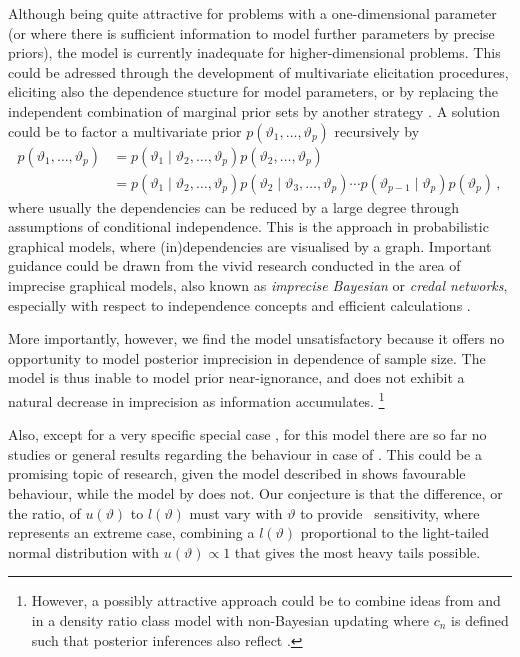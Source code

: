 Although being quite attractive for problems with a one-dimensional parameter
(or where there is sufficient information to model further parameters by precise priors),
the model is currently inadequate for higher-dimensional problems.
This could be adressed through the development of multivariate elicitation procedures,
eliciting also the dependence stucture for model parameters,
or by replacing the independent combination of marginal prior sets
by another strategy \parencite[as mentioned in][\S 5.2]{2011:rinderknecht:diss}.
A solution could be to factor a multivariate prior $p(\vartheta_1,\ldots,\vartheta_p)$
recursively by
\begin{align*}
p(\vartheta_1,\ldots,\vartheta_p)
 &= p(\vartheta_1\mid \vartheta_2,\ldots,\vartheta_p) p(\vartheta_2,\ldots,\vartheta_p) \\
 &= p(\vartheta_1\mid \vartheta_2,\ldots,\vartheta_p) p(\vartheta_2\mid \vartheta_3,\ldots,\vartheta_p)
    \cdots p(\vartheta_{p-1}\mid\vartheta_p) p(\vartheta_p)\,,
\end{align*}
where usually the dependencies can be reduced by a large degree through assumptions of conditional independence.
This is the approach in probabilistic graphical models,
where (in)dependencies are visualised by a graph.
Important guidance could be drawn from the vivid research conducted in the area
of imprecise graphical models, also known as \emph{imprecise Bayesian} or \emph{credal networks},
especially with respect to independence concepts and efficient calculations
\parencite[for a recent overview, see][]{itip-ipgms}.

More importantly, however, we find the model unsatisfactory because it offers no opportunity
to model posterior imprecision in dependence of sample size. %
The model is thus inable to model prior near-ignorance, and does not exhibit
a natural decrease in imprecision as information accumulates.%
\footnote{However, a possibly attractive approach could be to
combine ideas from \textcite{1993:coolen} and \textcite{2011:rinderknecht:diss}
in a density ratio class model with non-Bayesian updating
where $c_n$ is defined such that posterior inferences also reflect \pdc.}

Also, except for a very specific special case \parencite[\S 4.3, as discussed above]{1991:pericchi},
for this model there are so far no studies or general results regarding the behaviour in case of \pdc.
This could be a promising topic of research,
given the model described in \textcite[\S 4.3]{1991:pericchi} shows favourable behaviour,
while the model by \textcite{1993:coolen} does not.
Our conjecture is that the difference, or the ratio, of $u(\vartheta)$ to $l(\vartheta)$
must vary with $\vartheta$ to provide \pdc\ sensitivity,
where \textcite[\S 4.3]{1991:pericchi} represents an extreme case,
combining a $l(\vartheta)$ proportional to the light-tailed normal distribution %
with $u(\vartheta) \propto 1$ that gives the most heavy tails possible.

